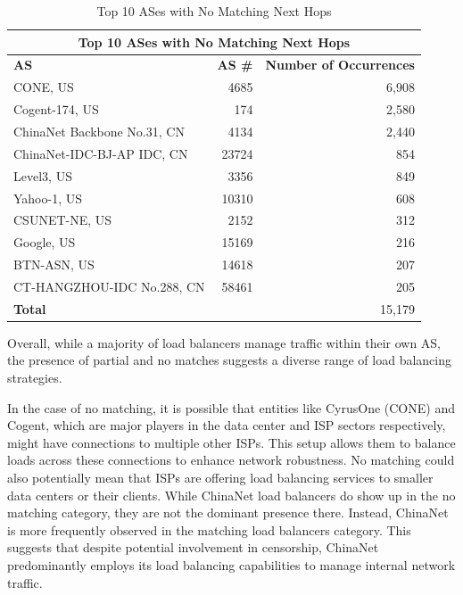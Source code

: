 \documentclass[12pt]{cwru_thesis}
\begin{document}
\begin{table}[h!]
    \centering
    \begin{tabular}{|l|r|r|}
        \hline
        \multicolumn{3}{|c|}{\textbf{Top 10 ASes with No Matching Next Hops}} \\
        \hline
        \textbf{AS} & \textbf{AS \#} & \textbf{Number of Occurrences} \\
        \hline
        CONE, US & 4685 & 6,908 \\
        Cogent-174, US & 174 & 2,580 \\
        ChinaNet Backbone No.31, CN & 4134 & 2,440 \\
        ChinaNet-IDC-BJ-AP IDC, CN & 23724 & 854 \\
        Level3, US & 3356 & 849 \\
        Yahoo-1, US & 10310 & 608 \\
        CSUNET-NE, US & 2152 & 312 \\
        Google, US & 15169 & 216 \\
        BTN-ASN, US & 14618 & 207 \\
        CT-HANGZHOU-IDC No.288, CN & 58461 & 205 \\
        \hline
        \textbf{Total} & & 15,179 \\
        \hline
    \end{tabular}
    \caption{Top 10 ASes with No Matching Next Hops}
    \label{tab:no_matching}
\end{table}

Overall, while a majority of load balancers manage traffic within their own AS, the presence of partial and no matches suggests a diverse range of load balancing strategies.

In the case of no matching, it is possible that entities like CyrusOne (CONE) and Cogent, which are major players in the data center and ISP sectors respectively, might have connections to multiple other ISPs. This setup allows them to balance loads across these connections to enhance network robustness. No matching could also potentially mean that ISPs are offering load balancing services to smaller data centers or their clients. While ChinaNet load balancers do show up in the no matching category, they are not the dominant presence there. Instead, ChinaNet is more frequently observed in the matching load balancers category. This suggests that despite potential involvement in censorship, ChinaNet predominantly employs its load balancing capabilities to manage internal network traffic.
\end{document}
